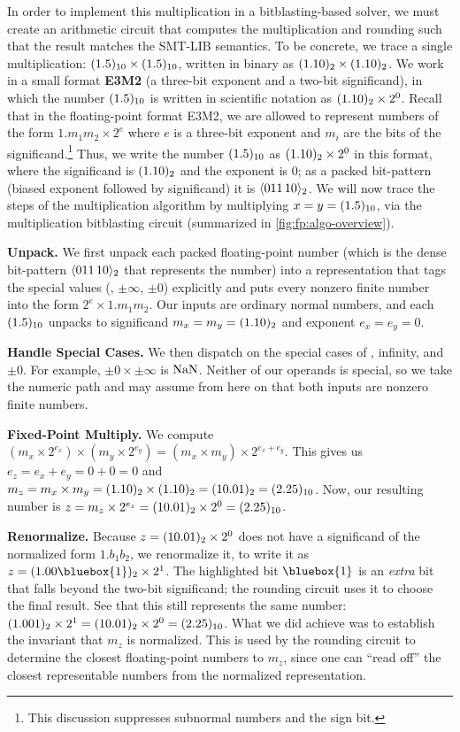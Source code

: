 In order to implement this multiplication in a bitblasting-based solver,
we must create an arithmetic circuit that computes the multiplication and rounding such that the result matches the SMT-LIB semantics.
To be concrete, we trace a single multiplication:
$(1.5)_{10} \times (1.5)_{10}$, written in binary as $(1.10)_{2} \times (1.10)_{2}$.
We work in a small format \textbf{E3M2} (a three-bit exponent and a two-bit significand), in which the number $(1.5)_{10}$ is
written in scientific notation as $(1.10)_{2} \times 2^0$.
Recall that in the floating-point format E3M2,
we are allowed to represent numbers of the form $1.m_1m_2 \times 2^e$ where $e$ is a three-bit exponent and $m_i$ are the bits of the significand.\footnote{This discussion suppresses subnormal numbers and the sign bit.}  Thus, we write the number $(1.5)_{10}$ as $(1.10)_{2} \times 2^0$ in this format, where the significand is $(1.10)_{2}$ and the exponent is $0$; as a packed bit-pattern (biased exponent followed by significand) it is $\langle 011\,10 \rangle_{2}$.
We will now trace the steps of the multiplication algorithm by multiplying $x = y = (1.5)_{10}$,
via the multiplication bitblasting circuit (summarized in \cref{fig:fp:algo-overview}).


\noindent\textbf{Unpack.}
We first unpack each packed floating-point number (which is the dense bit-pattern $\langle 011\,10 \rangle_{2}$ that represents the number)
into a representation that tags the special values (\nan{}, $\pm\infty$, $\pm 0$) explicitly and puts
every nonzero finite number into the form $2^{e} \times 1.m_1m_2$.
Our inputs are ordinary normal numbers, and each $(1.5)_{10}$ unpacks to significand
$m_x = m_y = (1.10)_{2}$ and exponent $e_x = e_y = 0$.

\noindent\textbf{Handle Special Cases.}
We then dispatch on the special cases of \nan{}, infinity, and $\pm 0$.
For example, $\pm 0 \times \pm\infty$ is $\mathrm{NaN}$.
Neither of our operands is special, so we take the numeric path and may assume
from here on that both inputs are nonzero finite numbers.

\noindent\textbf{Fixed-Point Multiply.}
We compute $(m_x \times 2^{e_x}) \times (m_y \times 2^{e_y}) = (m_x \times m_y) \times 2^{e_x + e_y}$.
This gives us $e_z = e_x + e_y = 0 + 0 = 0$ and $m_z = m_x \times m_y = (1.10)_{2} \times (1.10)_{2} = (10.01)_{2} = (2.25)_{10}$.
Now, our resulting number is $z = m_z \times 2^{e_z} = (10.01)_{2} \times 2^0 = (2.25)_{10}$.

\noindent\textbf{Renormalize.}
Because $z = (10.01)_{2} \times 2^0$ does not have a significand of the normalized form $1.b_1b_2$,
we renormalize it, to write it as $z = \basetwo{1.00\bluebox{1}} \times 2^1$.
The highlighted bit $\bluebox{1}$ is an \emph{extra} bit that falls beyond the two-bit significand;
the rounding circuit uses it to choose the final result.
See that this still represents the same number: $(1.001)_{2} \times 2^1 = (10.01)_{2} \times 2^0 = (2.25)_{10}$.
What we did achieve was to establish the invariant that $m_z$ is normalized.
This is used by the rounding circuit to determine the closest floating-point numbers to $m_z$,
since one can ``read off'' the closest representable numbers from the normalized representation.

